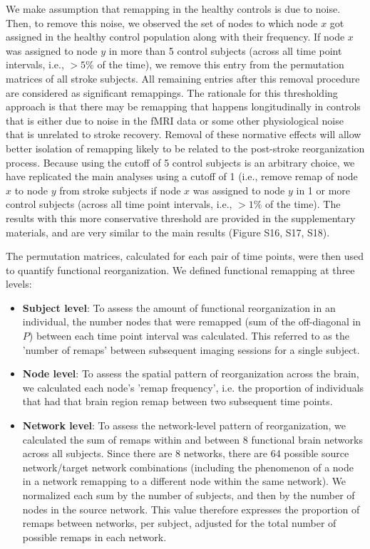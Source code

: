 \documentclass[phd,tocprelim]{cornell}
\begin{document}
	We make assumption that remapping in the healthy controls is due to noise. Then, to remove this noise, we observed the set of nodes to which node $x$ got assigned in the healthy control population along with their frequency. If node $x$ was assigned to node $y$ in more than 5 control subjects (across all time point intervals, i.e., $> 5 \%$ of the time), we remove this entry from the permutation matrices of all stroke subjects. All remaining entries after this removal procedure are considered as significant remappings. The rationale for this thresholding approach is that there may be remapping that happens longitudinally in controls that is either due to noise in the fMRI data or some other physiological noise that is unrelated to stroke recovery. Removal of these normative effects will allow better isolation of remapping likely to be related to the post-stroke reorganization process. Because using the cutoff of 5 control subjects is an arbitrary choice, we have replicated the main analyses using a cutoff of 1 (i.e., remove remap of node $x$ to node $y$ from stroke subjects if node $x$ was assigned to node $y$ in 1 or more control subjects (across all time point intervals, i.e., $> 1 \%$ of the time). The results with this more conservative threshold are provided in the supplementary materials, and are very similar to the main results (Figure S16, S17, S18).

	The permutation matrices, calculated for each pair of time points, were then used to quantify functional reorganization. We defined functional remapping at three levels:
	
	\begin{itemize}
	 \item \textbf{Subject level}: To assess the amount of functional reorganization in an individual, the number nodes that were remapped (sum of the off-diagonal in $P$) between each time point interval was calculated. This referred to as the 'number of remaps' between subsequent imaging sessions for a single subject.
	 
	 \item \textbf{Node level}: To assess the spatial pattern of reorganization across the brain, we calculated each node's 'remap frequency', i.e. the proportion of individuals that had that brain region remap between two subsequent time points.
	 
	 \item \textbf{Network level}: To assess the network-level pattern of reorganization, we calculated the sum of remaps within and between 8 functional brain networks across all subjects. Since there are 8 networks, there are 64 possible source network/target network combinations (including the phenomenon of a node in a network remapping to a different node within the same network). We normalized each sum by the number of subjects, and then by the number of nodes in the source network. This value therefore expresses the proportion of remaps between networks, per subject, adjusted for the total number of possible remaps in each network. 
	\end{itemize}
\end{document}
